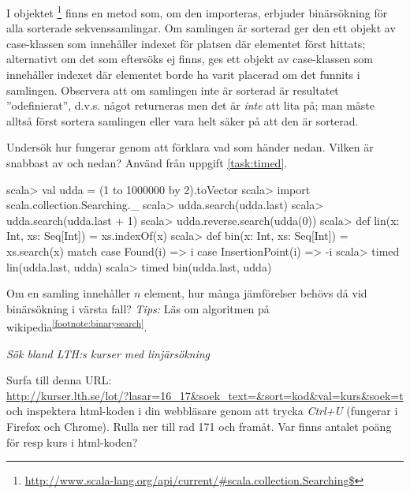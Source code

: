 I objektet \footnote{\href{http://www.scala-lang.org/api/current/\#scala.collection.Searching\$}{http://www.scala-lang.org/api/current/\#scala.collection.Searching\$}} finns en metod  som, om den importeras, erbjuder binärsökning för alla sorterade sekvenssamlingar. Om samlingen är sorterad ger den ett objekt av case-klassen  som innehåller indexet för platsen där elementet först hittats; alternativt om det som eftersöks ej finns, ges ett objekt av case-klassen  som innehåller indexet där elementet borde ha varit placerad om det funnits i samlingen. Observera att om samlingen inte är sorterad är resultatet ''odefinierat'', d.v.s. något returneras men det är \emph{inte} att lita på; man måste alltså först sortera samlingen eller vara helt säker på att den är sorterad. 

Undersök hur  fungerar genom att förklara vad som händer nedan. Vilken är snabbast av  och  nedan? Använd  från uppgift \ref{task:timed}.

\begin{REPL}
scala> val udda = (1 to 1000000 by 2).toVector
scala> import scala.collection.Searching._
scala> udda.search(udda.last)
scala> udda.search(udda.last + 1)
scala> udda.reverse.search(udda(0))  
scala> def lin(x: Int, xs: Seq[Int]) = xs.indexOf(x)
scala> def bin(x: Int, xs: Seq[Int]) = xs.search(x) match {
         case Found(i) => i
         case InsertionPoint(i) => -i
       }
scala> timed{ lin(udda.last, udda) }
scala> timed{ bin(udda.last, udda) }
\end{REPL}

\Subtask\Pen Om en samling innehåller $n$ element, hur många jämförelser behövs då vid binärsökning i värsta fall? \emph{Tips:} Läs om algoritmen på wikipedia\textsuperscript{\ref{footnote:binarysearch}}.





\Task \label{task:linsearch-lth}\emph{Sök bland LTH:s kurser med linjärsökning} 

\Subtask Surfa till denna URL:\\ {\nolinebreak[4]\footnotesize\url{http://kurser.lth.se/lot/?lasar=16_17&soek_text=&sort=kod&val=kurs&soek=t}}
\\
och inspektera html-koden i din webbläsare genom att trycka \emph{Ctrl+U} (fungerar i Firefox och Chrome). Rulla ner till rad 171 och framåt. Var finns antalet poäng för resp kurs i html-koden?

